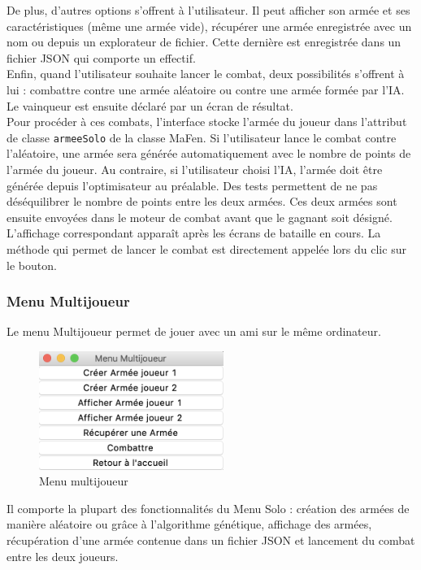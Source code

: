 \documentclass[a4paper]{article} %
\begin{document}
De plus, d'autres options s'offrent à l'utilisateur. Il peut afficher son armée et ses caractéristiques (même une armée vide), récupérer une armée enregistrée avec un nom ou depuis un explorateur de fichier. Cette dernière est enregistrée dans un fichier JSON qui comporte un effectif.\\

Enfin, quand l'utilisateur souhaite lancer le combat, deux possibilités s'offrent à lui : combattre contre une armée aléatoire ou contre une armée formée par l'IA.
Le vainqueur est ensuite déclaré par un écran de résultat.\\

Pour procéder à ces combats, l'interface stocke l'armée du joueur dans l'attribut de classe \texttt{armeeSolo} de la classe MaFen. Si l'utilisateur lance le combat contre l'aléatoire, une armée sera générée automatiquement avec le nombre de points de l'armée du joueur. Au contraire, si l'utilisateur choisi l'IA, l'armée doit être générée depuis l'optimisateur au préalable. Des tests permettent de ne pas déséquilibrer le nombre de points entre les deux armées. Ces deux armées sont ensuite envoyées dans le moteur de combat avant que le gagnant soit désigné. L'affichage correspondant apparaît après les écrans de bataille en cours. La méthode qui permet de lancer le combat est directement appelée lors du clic sur le bouton.

		\subsubsection{Menu Multijoueur}
Le menu Multijoueur permet de jouer avec un ami sur le même ordinateur.

\begin{figure}[!h]
	\begin{center}
	\includegraphics[width=6cm]{Images/menuMultijoueur.png}
	\caption{Menu multijoueur\label{fig:MenuMultijoueur}}
	\end{center}
\end{figure}

Il comporte la plupart des fonctionnalités du Menu Solo : création des armées de manière aléatoire ou grâce à l'algorithme génétique, affichage des armées, récupération d'une armée contenue dans un fichier JSON et lancement du combat entre les deux joueurs.
\end{document}
